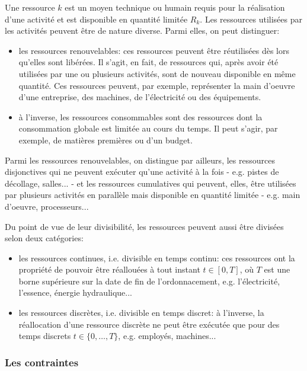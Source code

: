 Une ressource $k$ est un moyen technique ou humain requis pour la
réalisation d'une activité et est disponible en quantité limitée $R_k$. 
Les ressources utilisées par les activités peuvent être de nature
diverse. Parmi elles, on peut distinguer: 
\begin{itemize}
\item les ressources renouvelables: ces ressources peuvent être
réutilisées dès lors qu'elles sont libérées. Il s'agit, en fait, de
ressources qui, après avoir été utilisées par une ou plusieurs
activités, sont de nouveau disponible en même quantité. Ces ressources
peuvent, par exemple, représenter la main d'oeuvre d'une entreprise,
des machines, de l'électricité ou des équipements.
\item à l'inverse, les ressources consommables sont des ressources
dont la consommation globale est limitée au cours du temps. Il peut
s'agir, par exemple, de matières premières ou d'un budget.
\end{itemize}

Parmi les ressources renouvelables, on distingue par ailleurs, les
ressources disjonctives qui ne peuvent exécuter qu'une activité à la
fois - e.g. pistes de décollage, salles... - et les ressources cumulatives
qui peuvent, elles,  être utilisées par plusieurs activités en
parallèle mais disponible en quantité limitée - e.g. main d'oeuvre,
processeurs...


Du point de vue de leur divisibilité, les ressources peuvent aussi
être divisées selon deux catégories: 
\begin{itemize}
\item les ressources continues, i.e. divisible en temps continu: ces
  ressources ont la propriété de pouvoir être réallouées à tout
  instant $t \in [0,T]$, où $T$ est une borne supérieure sur la date de
  fin de l'ordonnacement, e.g. l'électricité, l'essence, énergie
  hydraulique...
\item les ressources discrètes, i.e. divisible en temps discret: à
  l'inverse, la réallocation d'une ressource discrète ne peut être
  exécutée que pour des temps discrets $t \in \{0,\dots,T\}$,
  e.g. employés, machines...
\end{itemize}
\subsubsection{Les contraintes}

